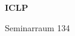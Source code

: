 \documentclass[a4paper]{article}
\begin{document}
\printGenericVSLHeader
\begin{center}
\begin{vsltext}{3cm}{4cm}

   \vspace{0.5cm} 

    \textbf{ICLP} 

    \vspace{1.5cm}

    Seminarraum 134

\end{vsltext}

\end{center}
\end{document}
